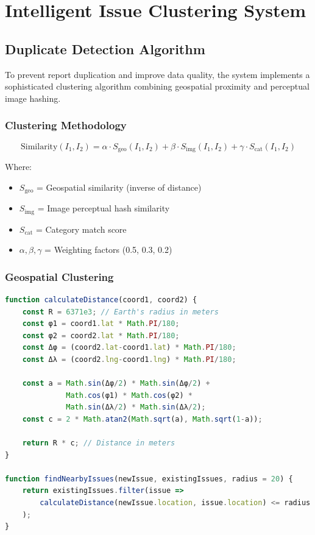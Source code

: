 \documentclass[12pt,a4paper]{article}
\begin{document}
\section{Intelligent Issue Clustering System}

\subsection{Duplicate Detection Algorithm}

To prevent report duplication and improve data quality, the system implements a sophisticated clustering algorithm combining geospatial proximity and perceptual image hashing.

\subsubsection{Clustering Methodology}

\begin{equation}
\text{Similarity}(I_1, I_2) = \alpha \cdot S_{\text{geo}}(I_1, I_2) + \beta \cdot S_{\text{img}}(I_1, I_2) + \gamma \cdot S_{\text{cat}}(I_1, I_2)
\end{equation}

Where:
\begin{itemize}
    \item $S_{\text{geo}}$ = Geospatial similarity (inverse of distance)
    \item $S_{\text{img}}$ = Image perceptual hash similarity
    \item $S_{\text{cat}}$ = Category match score
    \item $\alpha, \beta, \gamma$ = Weighting factors (0.5, 0.3, 0.2)
\end{itemize}

\subsubsection{Geospatial Clustering}

\begin{lstlisting}[language=JavaScript, caption=Geospatial Clustering Implementation]
function calculateDistance(coord1, coord2) {
    const R = 6371e3; // Earth's radius in meters
    const φ1 = coord1.lat * Math.PI/180;
    const φ2 = coord2.lat * Math.PI/180;
    const Δφ = (coord2.lat-coord1.lat) * Math.PI/180;
    const Δλ = (coord2.lng-coord1.lng) * Math.PI/180;

    const a = Math.sin(Δφ/2) * Math.sin(Δφ/2) +
              Math.cos(φ1) * Math.cos(φ2) *
              Math.sin(Δλ/2) * Math.sin(Δλ/2);
    const c = 2 * Math.atan2(Math.sqrt(a), Math.sqrt(1-a));

    return R * c; // Distance in meters
}

function findNearbyIssues(newIssue, existingIssues, radius = 20) {
    return existingIssues.filter(issue => 
        calculateDistance(newIssue.location, issue.location) <= radius
    );
}
\end{lstlisting}
\end{document}
